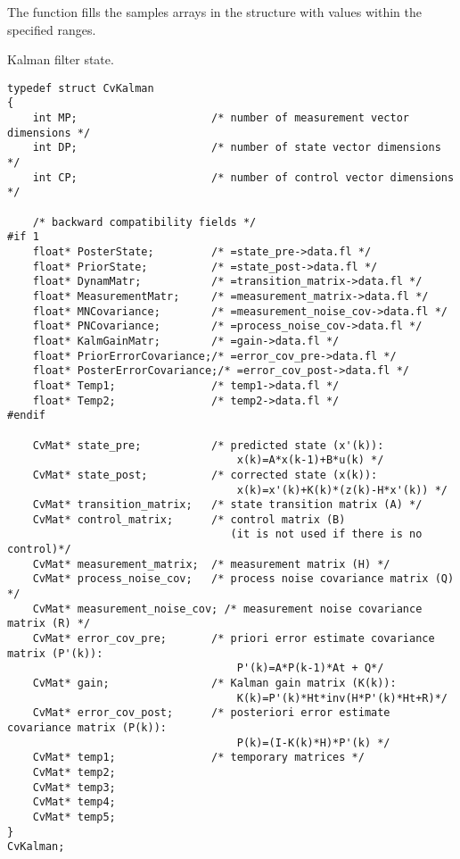 \begin{description}
\end{description}

The function fills the samples arrays in the structure  with values within the specified ranges.


\label{CvKalman}
Kalman filter state.

\begin{lstlisting}
typedef struct CvKalman
{
    int MP;                     /* number of measurement vector dimensions */
    int DP;                     /* number of state vector dimensions */
    int CP;                     /* number of control vector dimensions */

    /* backward compatibility fields */
#if 1
    float* PosterState;         /* =state_pre->data.fl */
    float* PriorState;          /* =state_post->data.fl */
    float* DynamMatr;           /* =transition_matrix->data.fl */
    float* MeasurementMatr;     /* =measurement_matrix->data.fl */
    float* MNCovariance;        /* =measurement_noise_cov->data.fl */
    float* PNCovariance;        /* =process_noise_cov->data.fl */
    float* KalmGainMatr;        /* =gain->data.fl */
    float* PriorErrorCovariance;/* =error_cov_pre->data.fl */
    float* PosterErrorCovariance;/* =error_cov_post->data.fl */
    float* Temp1;               /* temp1->data.fl */
    float* Temp2;               /* temp2->data.fl */
#endif

    CvMat* state_pre;           /* predicted state (x'(k)):
                                    x(k)=A*x(k-1)+B*u(k) */
    CvMat* state_post;          /* corrected state (x(k)):
                                    x(k)=x'(k)+K(k)*(z(k)-H*x'(k)) */
    CvMat* transition_matrix;   /* state transition matrix (A) */
    CvMat* control_matrix;      /* control matrix (B)
                                   (it is not used if there is no control)*/
    CvMat* measurement_matrix;  /* measurement matrix (H) */
    CvMat* process_noise_cov;   /* process noise covariance matrix (Q) */
    CvMat* measurement_noise_cov; /* measurement noise covariance matrix (R) */
    CvMat* error_cov_pre;       /* priori error estimate covariance matrix (P'(k)):
                                    P'(k)=A*P(k-1)*At + Q*/
    CvMat* gain;                /* Kalman gain matrix (K(k)):
                                    K(k)=P'(k)*Ht*inv(H*P'(k)*Ht+R)*/
    CvMat* error_cov_post;      /* posteriori error estimate covariance matrix (P(k)):
                                    P(k)=(I-K(k)*H)*P'(k) */
    CvMat* temp1;               /* temporary matrices */
    CvMat* temp2;
    CvMat* temp3;
    CvMat* temp4;
    CvMat* temp5;
}
CvKalman;
\end{lstlisting}

